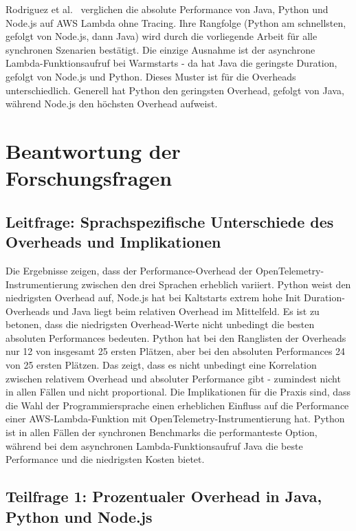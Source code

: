Rodriguez et al.~\cite{Rodriguez2024Evaluation} verglichen die absolute Performance von Java, Python und Node.js auf AWS Lambda ohne 
Tracing. Ihre Rangfolge (Python am schnellsten, gefolgt von Node.js, dann Java) wird durch die vorliegende Arbeit für alle synchronen 
Szenarien bestätigt. Die einzige Ausnahme ist der asynchrone Lambda-Funktionsaufruf bei Warmstarts - da hat Java die geringste Duration, 
gefolgt von Node.js und Python. Dieses Muster ist für die Overheads unterschiedlich. Generell hat Python den geringsten Overhead, 
gefolgt von Java, während Node.js den höchsten Overhead aufweist.

\section{Beantwortung der Forschungsfragen}

\subsection{Leitfrage: Sprachspezifische Unterschiede des Overheads und Implikationen}

Die Ergebnisse zeigen, dass der Performance-Overhead der OpenTelemetry-Instrumentierung zwischen den drei Sprachen 
erheblich variiert. Python weist den niedrigsten Overhead auf, Node.js hat bei Kaltstarts extrem hohe Init Duration-Overheads 
und Java liegt beim relativen Overhead im Mittelfeld. Es ist zu betonen, dass die niedrigsten Overhead-Werte nicht unbedingt die 
besten absoluten Performances bedeuten. Python hat bei den Ranglisten der Overheads nur 12 von insgesamt 25 ersten Plätzen, aber bei 
den absoluten Performances 24 von 25 ersten Plätzen. Das zeigt, dass es nicht unbedingt eine Korrelation zwischen relativem Overhead 
und absoluter Performance gibt - zumindest nicht in allen Fällen und nicht proportional.
Die Implikationen für die Praxis sind, dass die Wahl der Programmiersprache einen erheblichen Einfluss auf die Performance einer 
AWS-Lambda-Funktion mit OpenTelemetry-Instrumentierung hat. Python ist in allen Fällen der synchronen Benchmarks die performanteste 
Option, während bei dem asynchronen Lambda-Funktionsaufruf Java die beste Performance und die niedrigsten Kosten bietet. 

\subsection{Teilfrage 1: Prozentualer Overhead in Java, Python und Node.js}

